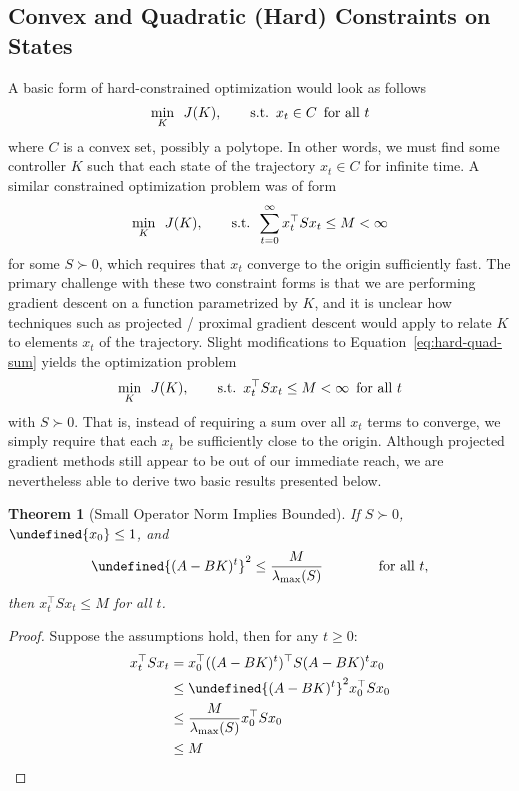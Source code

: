 \documentclass[11pt]{article}  %
\newtheorem{theorem}{Theorem}
\let\norm\undefined
\newcommand{\norm}[1]{\lVert #1 \rVert}
\begin{document}
\subsection{Convex and Quadratic (Hard) Constraints on States}
A basic form of hard-constrained optimization would look as follows
\begin{align}
  \min_{K} \enskip J(K),
    \qquad
  \mathrm{s.t.} \enskip x_t \in C \enskip \text{for all \(t\)}
\end{align}
where \(C\) is a convex set, possibly a polytope.
In other words, we must find some controller \(K\) such that
each state of the trajectory \(x_t \in C\) for infinite time.
A similar constrained optimization problem was of form
\begin{align}
  \min_K \enskip J(K),
    \qquad
  \mathrm{s.t.} \enskip \sum_{t = 0}^{\infty} x_t ^\top S x_t \leq M < \infty
  \label{eq:hard-quad-sum}
\end{align}
for some \(S \succ 0\),
which requires that \(x_t\) converge to the origin sufficiently fast.
The primary challenge with these two constraint forms is that
we are performing gradient descent on a function parametrized by \(K\),
and it is unclear how techniques such as projected / proximal gradient
descent would apply to relate \(K\) to elements \(x_t\) of the trajectory.
Slight modifications to Equation~\ref{eq:hard-quad-sum}
yields the optimization problem
\begin{align}
  \min_K \enskip J(K),
    \qquad
  \mathrm{s.t.}
    \enskip x_t ^\top S x_t \leq M < \infty \enskip \text{for all \(t\)}
\end{align}
with \(S \succ 0\).
That is, instead of requiring a sum over all \(x_t\) terms to converge,
we simply require that each \(x_t\) be sufficiently 
close to the origin.
Although projected gradient methods still appear to be out of our immediate
reach,
we are nevertheless able to derive two basic results presented below.

\begin{theorem}[Small Operator Norm Implies Bounded]
  If \(S \succ 0\), \(\norm{x_0} \leq 1\), and
  \begin{align}
    \norm{(A - BK)^t}^2 \leq \frac{M}{\lambda_{\max} (S)}
    \qquad
    \qquad
    \text{for all \(t\)},
  \end{align}
  then \(x_t ^\top S x_t \leq M\) for all \(t\).
\end{theorem}
\begin{proof}
  Suppose the assumptions hold,
  then for any \(t \geq 0\):
  \begin{align}
    x_t ^\top S x_t
      &= x_0 ^\top ((A - BK)^t)^\top S (A - BK)^t x_0 \\
      &\leq \norm{(A - BK)^t}^2 x_0 ^\top S x_0 \\
      &\leq \frac{M}{\lambda_{\max} (S)} x_0 ^\top S x_0 \\
      &\leq M
  \end{align}
\end{proof}
\end{document}
